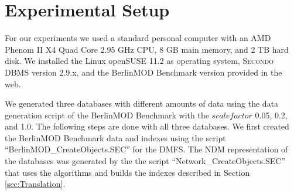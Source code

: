 \documentclass[a4paper]{article}
\newcommand{\secondo}{\textsc{Secondo}}
\newcommand{\bmodb} {BerlinMOD Benchmark}
\newcommand{\secver}{2.9.x}
\begin{document}
{\section{Experimental Setup}
\label{sec:scenario}
For our experiments we used a standard personal computer with an AMD Phenom II X4
Quad Core 2.95 GHz CPU, 8 GB main memory, and 2 TB hard disk. We installed the
Linux openSUSE 11.2 as operating system, \secondo{} DBMS version \secver{}, and
the \bmodb{} version provided in the web.

We generated three databases with different amounts of data using the data generation
script of the \bmodb{} with the $scalefactor$ 0.05, 0.2, and 1.0. The following
steps are done with all three databases. We first created the \bmodb{} data and indexes
using the script ``BerlinMOD\_CreateObjects.SEC'' for the DMFS. The NDM
representation of the databases was generated by the the script ``Network\_CreateObjects.SEC''
that uses the algorithms and builds the indexes described in Section \ref{sec:Translation}.

}
\end{document}
